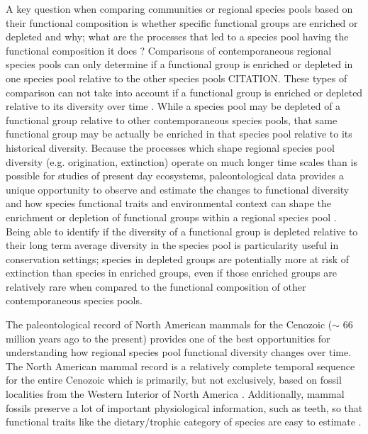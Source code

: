 \documentclass[12pt,letterpaper]{article}
\begin{document}
A key question when comparing communities or regional species pools based on their functional composition is whether specific functional groups are enriched or depleted and why; what are the processes that led to a species pool having the functional composition it does \citep{Mcgill2006,Weber2017,Brown1989,Bambach1996,Jernvall2004,Smith2008b,Blois2009}? Comparisons of contemporaneous regional species pools can only determine if a functional group is enriched or depleted in one species pool relative to the other species pools CITATION. These types of comparison can not take into account if a functional group is enriched or depleted relative to its diversity over time \citep{Blois2009}. While a species pool may be depleted of a functional group relative to other contemporaneous species pools, that same functional group may be actually be enriched in that species pool relative to its historical diversity. Because the processes which shape regional species pool diversity (e.g. origination, extinction) operate on much longer time scales than is possible for studies of present day ecosystems, paleontological data provides a unique opportunity to observe and estimate the changes to functional diversity and how species functional traits and environmental context can shape the enrichment or depletion of functional groups within a regional species pool \citep{Blois2009,Smith2008b}. Being able to identify if the diversity of a functional group is depleted relative to their long term average diversity in the species pool is particularity useful in conservation settings; species in depleted groups are potentially more at risk of extinction than species in enriched groups, even if those enriched groups are relatively rare when compared to the functional composition of other contemporaneous species pools.

The paleontological record of North American mammals for the Cenozoic (\(\sim\) 66 million years ago to the present) provides one of the best opportunities for understanding how regional species pool functional diversity changes over time. The North American mammal record is a relatively complete temporal sequence for the entire Cenozoic which is primarily, but not exclusively, based on fossil localities from the Western Interior of North America \citep{Alroy1996a,Alroy2000g,Alroy2009}. Additionally, mammal fossils preserve a lot of important physiological information, such as teeth, so that functional traits like the dietary/trophic category of species are easy to estimate \citep{Polly2015a,Polly2011b,Eronen2010a}.
\end{document}
